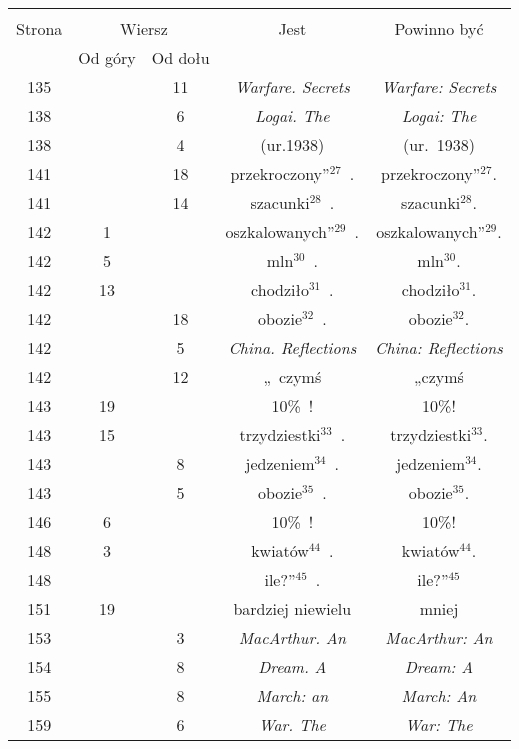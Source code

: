 \documentclass[a4paper,11pt]{article}
\begin{document}
\begin{center}
  \begin{tabular}{|c|c|c|c|c|}
    \hline
    & \multicolumn{2}{c|}{} & & \\
    Strona & \multicolumn{2}{c|}{Wiersz} & Jest
                              & Powinno być \\ \cline{2-3}
    & Od góry & Od dołu & & \\
    \hline
    135 & & 11 & \textit{Warfare. Secrets} & \textit{Warfare: Secrets} \\
    138 & &  6 & \textit{Logai. The} & \textit{Logai: The} \\
    138 & &  4 & (ur.1938) & (ur.~1938) \\
    141 & & 18 & przekroczony''$^{ 27 }$~. & przekroczony''$^{ 27 }$. \\
    141 & & 14 & szacunki$^{ 28 }$~. & szacunki$^{ 28 }$. \\
    142 &  1 & & oszkalowanych''$^{ 29 }$~. & oszkalowanych''$^{ 29 }$. \\
    142 &  5 & & mln$^{ 30 }$~. & mln$^{ 30 }$. \\
    142 & 13 & & chodziło$^{ 31 }$~. & chodziło$^{ 31 }$. \\
    142 & & 18 & obozie$^{ 32 }$~. & obozie$^{ 32 }$. \\
    142 & &  5 & \textit{China. Reflections}
           & \textit{China: Reflections} \\
    142 & & 12 & „~czymś & „czymś \\
    143 & 19 & & 10\%~! & 10\%! \\
    143 & 15 & & trzydziestki$^{ 33 }$~. & trzydziestki$^{ 33 }$. \\
    143 & &  8 & jedzeniem$^{ 34 }$~. & jedzeniem$^{ 34 }$. \\
    143 & &  5 & obozie$^{ 35 }$~.  & obozie$^{ 35 }$. \\
    146 &  6 & & 10\%~! & 10\%! \\
    148 &  3 & & kwiatów$^{ 44 }$~. & kwiatów$^{ 44 }$. \\
    148 & & & ile?”$^{ 45 }$~. & ile?”$^{ 45 }$ \\
    151 & 19 & & bardziej niewielu & mniej \\
    153 & &  3 & \textit{MacArthur. An} & \textit{MacArthur: An} \\
    154 & &  8 & \textit{Dream. A} & \textit{Dream: A} \\
    155 & &  8 & \textit{March: an} & \textit{March: An} \\
    159 & &  6 & \textit{War. The} & \textit{War: The} \\

\end{tabular}
\end{center}
\end{document}
